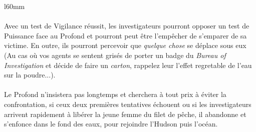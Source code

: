 \begin{wrapfigure}{l}{60mm}
\end{wrapfigure}

\paragraph{} Avec un test de Vigilance réussit, les investigateurs pourront opposer un test de Puissance face au Profond et pourront peut être l'empêcher
de s'emparer de sa victime. En outre, ils pourront percevoir que \textit{quelque chose} se déplace sous eux (Au cas où vos agents se sentent
grisés de porter un badge du \textit{Bureau of Investigation} et décide de faire un \textit{carton}, rappelez leur l'effet regretable de l'eau
sur la poudre...).

\paragraph{} Le Profond n'insistera pas longtemps et cherchera à tout prix à éviter la confrontation, si ceux deux premières tentatives échouent ou
si les investigateurs arrivent rapidement à libérer la jeune femme du filet de pêche, il abandonne et s'enfonce dans le fond des eaux, pour rejoindre
l'Hudson puis l'océan.
